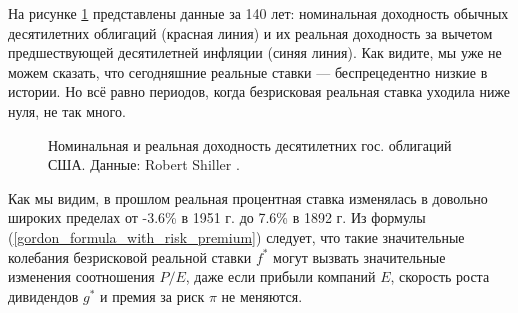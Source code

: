 На рисунке \ref{long_run_interest_rates} представлены данные за 140 лет: номинальная доходность обычных десятилетних облигаций (красная линия) и их реальная доходность за вычетом предшествующей десятилетней инфляции (синяя линия). Как видите, мы уже не можем сказать, что сегодняшние реальные ставки --- беспрецедентно низкие в истории. Но всё равно периодов, когда безрисковая реальная ставка уходила ниже нуля, не так много.



\begin{figure}[ht]
\centering
{}
\caption{Номинальная и реальная доходность десятилетних гос. облигаций США. Данные: Robert Shiller \cite{shillerOnline}.}
\label{long_run_interest_rates}
\end{figure}

Как мы видим, в прошлом реальная процентная ставка изменялась в довольно широких пределах от -3.6\% в 1951 г. до 7.6\% в 1892 г. Из формулы (\ref{gordon_formula_with_risk_premium}) следует, что такие значительные колебания безрисковой реальной ставки $f^*$ могут вызвать значительные изменения соотношения $P/E$, даже если прибыли компаний $E$, скорость роста дивидендов $g^*$ и премия за риск $\pi$ не меняются.

